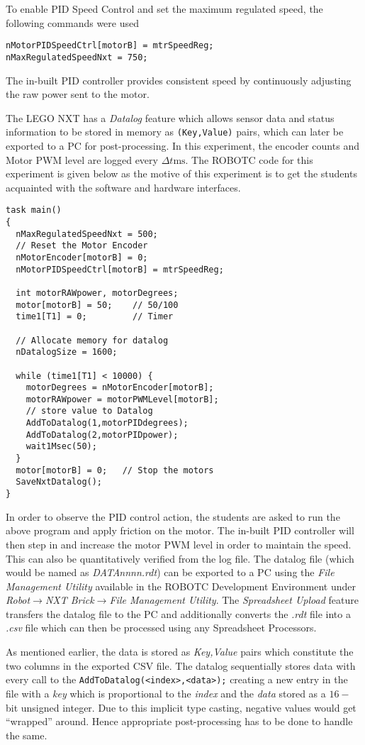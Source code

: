 \documentclass[paper=a4, fontsize=11pt]{scrartcl}
\numberwithin{equation}{section}        %
\numberwithin{figure}{section}          %
\numberwithin{table}{section}           %
\begin{document}
To enable PID Speed Control and set the maximum regulated speed, the following commands were used
\begin{verbatim}
nMotorPIDSpeedCtrl[motorB] = mtrSpeedReg;
nMaxRegulatedSpeedNxt = 750;
\end{verbatim}
The in-built PID controller provides consistent speed by continuously adjusting the raw power sent to the motor.

The LEGO NXT has a \emph{Datalog} feature which allows sensor data and status information to be stored in memory as \verb|(Key,Value)| pairs, which can later be exported to a PC for post-processing. In this experiment, the encoder counts and Motor PWM level are logged every $\Delta{}t  \text{ms}$. The ROBOTC code for this experiment is given below as the motive of this experiment is to get the students acquainted with the software and hardware interfaces. 
\begin{verbatim}
task main()
{
  nMaxRegulatedSpeedNxt = 500;
  // Reset the Motor Encoder
  nMotorEncoder[motorB] = 0;
  nMotorPIDSpeedCtrl[motorB] = mtrSpeedReg;

  int motorRAWpower, motorDegrees;
  motor[motorB] = 50;    // 50/100
  time1[T1] = 0;         // Timer

  // Allocate memory for datalog
  nDatalogSize = 1600;

  while (time1[T1] < 10000) {
    motorDegrees = nMotorEncoder[motorB];
    motorRAWpower = motorPWMLevel[motorB];     
    // store value to Datalog
    AddToDatalog(1,motorPIDdegrees);
    AddToDatalog(2,motorPIDpower);
    wait1Msec(50);
  }
  motor[motorB] = 0;   // Stop the motors
  SaveNxtDatalog();
}
\end{verbatim}

In order to observe the PID control action, the students are asked to run the above program and apply friction on the motor. The in-built PID controller will then step in and increase the motor PWM level in order to maintain the speed. This can also be quantitatively verified from the log file. The datalog file (which would be named as \emph{DATAnnnn.rdt}) can be exported to a PC using the \emph{File Management Utility} available in the ROBOTC Development Environment under \emph{Robot$\to$NXT Brick$\to$File Management Utility}. The \emph{Spreadsheet Upload} feature transfers the datalog file to the PC and additionally converts the \emph{.rdt} file into a \emph{.csv} file which can then be processed using any Spreadsheet Processors.

As mentioned earlier, the data is stored as \emph{Key,Value} pairs which constitute the two columns in the exported CSV file. The datalog sequentially stores data with every call to the \verb|AddToDatalog(<index>,<data>);| creating a new entry in the file with a \emph{key} which is proportional to the \emph{index} and the \emph{data} stored as a $16-$bit unsigned integer. Due to this implicit type casting, negative values would get ``wrapped'' around. Hence appropriate post-processing has to be done to handle the same.
\end{document}
